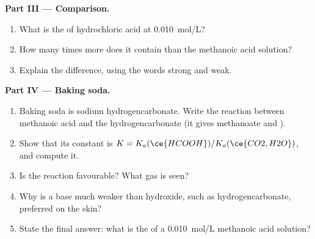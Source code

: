 \begin{problem}
\medskip
\noindent\textbf{Part III --- Comparison.}
\begin{enumerate}[resume]
  \item What is the  of hydrochloric acid at \qty{0.010}{mol/L}?
  \item How many times more  does it contain than the
        methanoic acid solution?
  \item Explain the difference, using the words strong and weak.
\end{enumerate}

\medskip
\noindent\textbf{Part IV --- Baking soda.}
\begin{enumerate}[resume]
  \item Baking soda is sodium hydrogencarbonate. Write the reaction
        between methanoic acid and the hydrogencarbonate  (it gives
        methanoate and ).
  \item Show that its constant is $K = K_a(\ce{HCOOH}) / K_a(\ce{CO2,H2O})$,
        and compute it.
  \item Is the reaction favourable? What gas is seen?
  \item Why is a base much weaker than hydroxide, such as hydrogencarbonate,
        preferred on the skin?
  \item State the final answer: what is the  of a \qty{0.010}{mol/L}
        methanoic acid solution?
\end{enumerate}
\end{problem}
